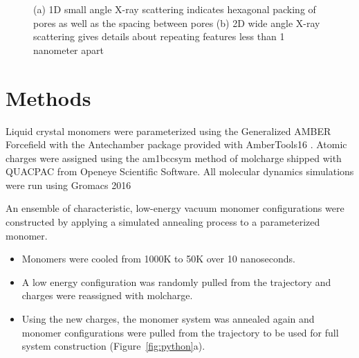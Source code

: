 \documentclass{article}
\begin{document}
\begin{figure}
\begin{subfigure}[t]{0.47\linewidth}
{                }
                \caption{}\label{fig:WAXS}
        \end{subfigure}
        \caption{(a) 1D small angle X-ray scattering indicates hexagonal packing of
        pores as well as the spacing between pores (b) 2D wide angle X-ray scattering
        gives details about repeating features less than 1 nanometer apart}\label{fig:SWAXS}
  \end{figure}

  \section*{Methods}
 

 
  Liquid crystal monomers were parameterized using the Generalized AMBER Forcefield
  \cite{wang_development_2004} with the Antechamber package \cite{wang_automatic_2006}
  provided with AmberTools16 \cite{case_ambertools16_2016}. Atomic charges were
  assigned using the am1bccsym method of molcharge shipped with QUACPAC from Openeye %
  Scientific Software. All molecular dynamics simulations were run using Gromacs 2016  %
  \cite{bekker_gromacs:_1993,berendsen_gromacs:_1995,van_der_spoel_gromacs:_2005,hess_gromacs_2008}
  
  An ensemble of characteristic, low-energy vacuum monomer configurations
  were constructed by applying a simulated annealing process to a
  parameterized monomer.
  \begin{itemize}
    \item Monomers were cooled from 1000K to 50K over 10 nanoseconds.
    \item A low energy configuration was randomly pulled from the trajectory
    and charges were reassigned with molcharge. 
    \item Using the new charges, the monomer system was annealed again and monomer
    configurations were pulled from the trajectory to be used for full
    system construction (Figure~\ref{fig:python}a).
  \end{itemize}

\end{document}
